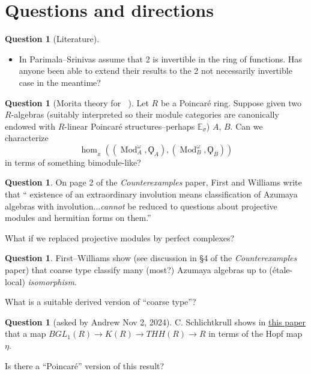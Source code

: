 \documentclass{article}
\DeclareMathOperator{\Catp}{Cat^p_\infty} %
\DeclareMathOperator{\Mod}{Mod} %
\theoremstyle{definition}
\newtheorem{question}[equation]{Question}
\begin{document}
\section{Questions and directions}
\begin{question}
    [Literature]
\begin{itemize}
    \item In \cite{MR1162189} Parimala--Srinivas assume that 2 is invertible in the ring of functions. 
    Has anyone been able to extend their results to the 2 not necessarily invertible case in the meantime? 
\end{itemize}
\end{question}
\begin{question}
    [Morita theory for $ \Catp $]
    Let $ R $ be a Poincaré ring. 
    Suppose given two $ R $-algebras (suitably interpreted so their module categories are canonically endowed with $ R $-linear Poincaré structures--perhaps $ \mathbb{E}_\sigma $) $ A $, $ B $. 
    Can we characterize
    \begin{equation*}
        \hom_{\Catp_R}\left(\left(\Mod_A^\omega,\Qoppa_A\right),\left(\Mod_B^\omega,\Qoppa_B\right)\right)
     \end{equation*} 
     in terms of something bimodule-like? 
\end{question}
\begin{question}
    On page 2 of the \emph{Counterexamples} paper, First and Williams write that `` existence of an extraordinary involution means classification of Azumaya algebras with involution...\emph{cannot} be reduced to questions about projective modules and hermitian forms on them.'' 

    What if we replaced projective modules by perfect complexes? 
\end{question}
\begin{question}
    First--Williams show (see discussion in \S4 of the \emph{Counterexamples} paper) that coarse type classify many (most?) Azumaya algebras up to (étale-local) \emph{isomorphism}. 

    What is a suitable derived version of ``coarse type''?
\end{question}

\begin{question}
    [asked by Andrew Nov 2, 2024] 
    C. Schlichtkrull shows in \href{https://arxiv.org/pdf/math/0405079}{this paper} that a map $ BGL_1(R) \to K(R) \to THH(R) \to R $ in terms of the Hopf map $ \eta $. 

    Is there a ``Poincaré'' version of this result? 
\end{question}
\end{document}
